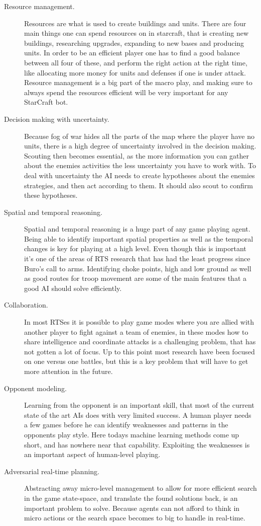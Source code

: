 \begin{description}
  \item [Resource management.] Resources are what is used to create buildings
and units. There are four main things one can spend resources on in starcraft,
that is creating new buildings, researching upgrades, expanding to new bases and
producing units. In order to be an efficient player one has to find a good
balance between all four of these, and perform the right action at the right
time, like allocating more money for units and defenses if one is under attack.
Resource management is a big part of the macro play, and making sure to always
spend the resources efficient will be very important for any StarCraft bot.
  \item [Decision making with uncertainty.] Because fog of war hides all the
parts of the map where the player have no units, there is a high degree of
uncertainty involved in the decision making. Scouting then becomes essential, as
the more information you can gather about the enemies activities the less
uncertainty you have to work with. To deal with uncertainty the AI needs to
create hypotheses about the enemies strategies, and then act according to them.
It should also scout to confirm these hypotheses.
  \item [Spatial and temporal reasoning.] Spatial and temporal reasoning is a
huge part of any game playing agent. Being able to identify important spatial
properties as well as the temporal changes is key for playing at a high level.
Even though this is important it's one of the areas of RTS research that has had
the least progress since Buro's call to arms. Identifying choke points, high and
low ground as well as good routes for troop movement are some of the main
features that a good AI should solve efficiently. 
   \item [Collaboration.] In most RTSes it is possible to play game modes where
you are allied with another player to fight against a team of enemies, in these
modes how to share intelligence and coordinate attacks is a challenging problem,
that has not gotten a lot of focus. Up to this point most research have been
focused on one versus one battles, but this is a key problem that will have to
get more attention in the future. 
  \item [Opponent modeling.] Learning from the opponent is an important skill,
that most of the current state of the art AIs does with very limited success. A
human player needs a few games before he can identify weaknesses and
patterns in the opponents play style. Here todays machine learning methods come
up short, and has nowhere near that capability. Exploiting the weaknesses is an
important aspect of human-level playing.
  \item [Adversarial real-time planning.] Abstracting away micro-level
management to allow for more efficient search in the game state-space, and
translate the found solutions back, is an important problem to solve. Because
agents can not afford to think in micro actions or the search space becomes to
big to handle in real-time. 
\end{description}

